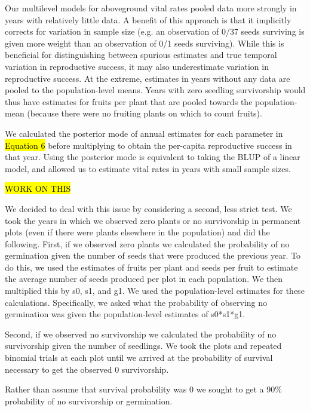 \documentclass[12pt, oneside, titlepage]{article}   	%
\begin{document}
Our multilevel models for aboveground vital rates pooled data more strongly in years with relatively little data. A benefit of this approach is that it implicitly corrects for variation in sample size (e.g. an observation of 0/37 seeds surviving is given more weight than an observation of 0/1 seeds surviving). While this is beneficial for distinguishing between spurious estimates and true temporal variation in reproductive success, it may also underestimate variation in reproductive success. At the extreme, estimates in years without any data are pooled to the population-level means. Years with zero seedling survivorship would thus have estimates for fruits per plant that are pooled towards the population-mean (because there were no fruiting plants on which to count fruits). 

We calculated the posterior mode of annual estimates for each parameter in \hl{Equation 6} before multiplying to obtain the per-capita reproductive success in that year. Using the posterior mode is equivalent to taking the BLUP of a linear model, and allowed us to estimate vital rates in years with small sample sizes. 

\hl{WORK ON THIS}


We decided to deal with this issue by considering a second, less strict test. We took the years in which we observed zero plants or no survivorship in permanent plots (even if there were plants elsewhere in the population) and did the following. First, if we observed zero plants we calculated the probability of no germination given the number of seeds that were produced the previous year. To do this, we used the estimates of fruits per plant and seeds per fruit to estimate the average number of seeds produced per plot in each population. We then multiplied this by s0, s1, and g1. We used the population-level estimates for these calculations. Specifically, we asked what the probability of observing no germination was given the population-level estimates of s0*s1*g1.

Second, if we observed no survivorship we calculated the probability of no survivorship given the number of seedlings. We took the plots and repeated binomial trials at each plot until we arrived at the probability of survival necessary to get the observed 0 survivorship. 

Rather than assume that survival probability was 0 we sought to get a 90\% probability of no survivorship or germination. 




\end{document}

